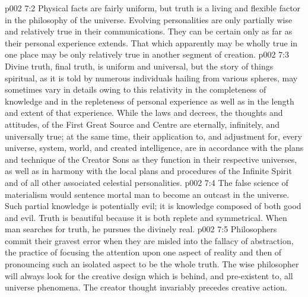 \vs p002 7:2 Physical facts are fairly uniform, but truth is a living and flexible factor in the philosophy of the universe. Evolving personalities are only partially wise and relatively true in their communications. They can be certain only as far as their personal experience extends. That which apparently may be wholly true in one place may be only relatively true in another segment of creation.
\vs p002 7:3 Divine truth, final truth, is uniform and universal, but the story of things spiritual, as it is told by numerous individuals hailing from various spheres, may sometimes vary in details owing to this relativity in the completeness of knowledge and in the repleteness of personal experience as well as in the length and extent of that experience. While the laws and decrees, the thoughts and attitudes, of the First Great Source and Centre are eternally, infinitely, and universally true; at the same time, their application to, and adjustment for, every universe, system, world, and created intelligence, are in accordance with the plans and technique of the Creator Sons as they function in their respective universes, as well as in harmony with the local plans and procedures of the Infinite Spirit and of all other associated celestial personalities.
\vs p002 7:4 \pc The false science of materialism would sentence mortal man to become an outcast in the universe. Such partial knowledge is potentially evil; it is knowledge composed of both good and evil. Truth is beautiful because it is both replete and symmetrical. When man searches for truth, he pursues the divinely real.
\vs p002 7:5 Philosophers commit their gravest error when they are misled into the fallacy of abstraction, the practice of focusing the attention upon one aspect of reality and then of pronouncing such an isolated aspect to be the whole truth. The wise philosopher will always look for the creative design which is behind, and pre\hyp{}existent to, all universe phenomena. The creator thought invariably precedes creative action.
